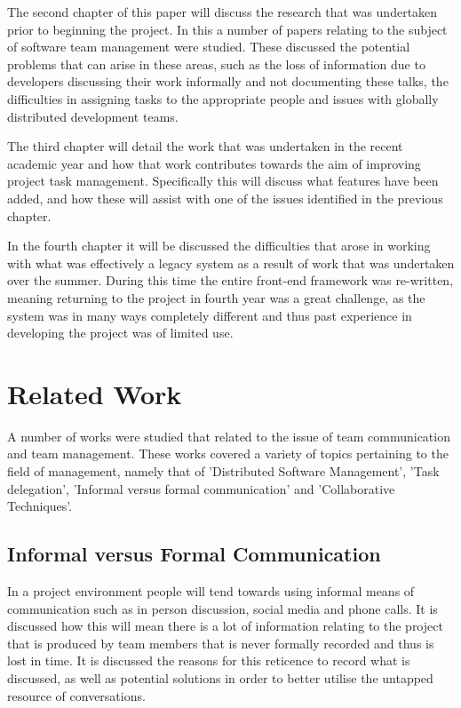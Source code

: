 \documentclass{l4proj}
\begin{document}
The second chapter of this paper will discuss the research that was undertaken prior to beginning the project. In this a number of papers relating to the subject of software team management were studied.  These discussed the potential problems that can arise in these areas, such as the loss of information due to developers discussing their work informally and not documenting these talks, the difficulties in assigning tasks to the appropriate people and issues with globally distributed development teams.

The third chapter will detail the work that was undertaken in the recent academic year and how that work contributes towards the aim of improving project task management. Specifically this will discuss what features have been added, and how these will assist with one of the issues identified in the previous chapter.

In the fourth chapter it will be discussed the difficulties that arose in working with what was effectively a legacy system as a result of work that was undertaken over the summer.  During this time the entire front-end framework was re-written, meaning returning to the project in fourth year was a great challenge, as the system was in many ways completely different and thus past experience in developing the project was of limited use.  

\chapter{Related Work}
A number of works were studied that related to the issue of team communication and team management.  These works covered a variety of topics pertaining to the field of management, namely that of 'Distributed Software Management', 'Task delegation', 'Informal versus formal communication' and 'Collaborative Techniques'.

\section {Informal versus Formal Communication}

In a project environment people will tend towards using informal means of communication such as in person discussion, social media and phone calls.  It is discussed how this will mean there is a lot of information relating to the project that is produced by team members that is never formally recorded and thus is lost in time.  It is discussed the reasons for this reticence to record what is discussed, as well as potential solutions in order to better utilise the untapped resource of conversations.
\end{document}

